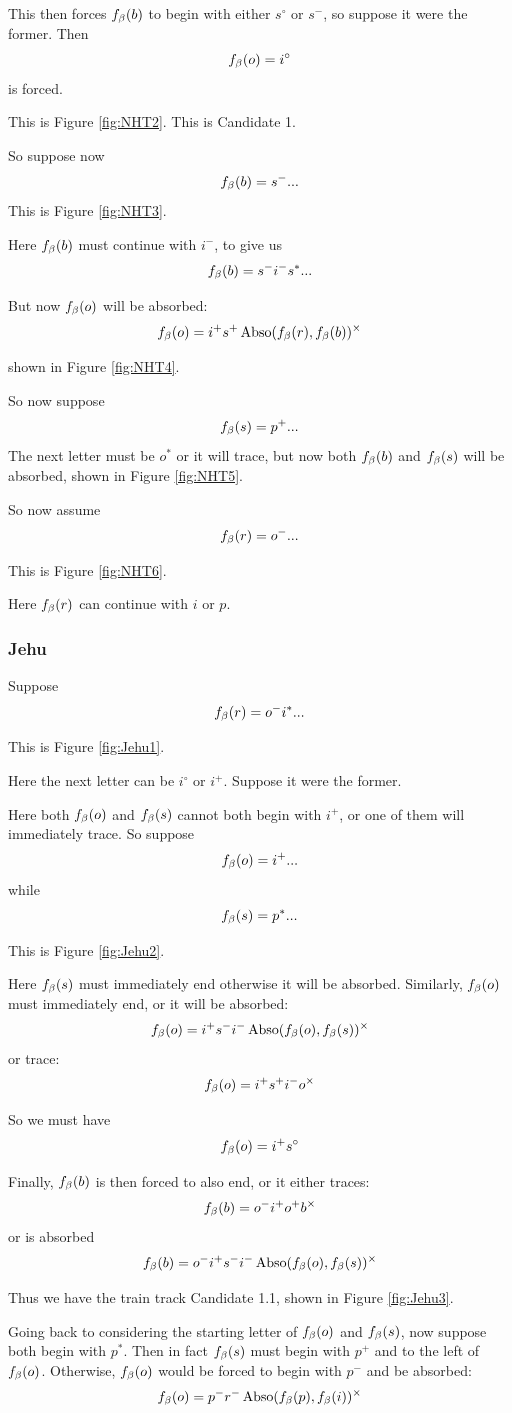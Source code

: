 This then forces $f_\beta(b)$ to begin with either $s^\circ$ or $s^-$, so suppose it were the former. Then 
$$f_\beta(o) = i^\circ$$
is forced.

This is Figure \ref{fig:NHT2}. This is Candidate 1.

So suppose now
$$f_\beta(b) = s^-...$$
This is Figure \ref{fig:NHT3}.

Here $f_\beta(b)$ must continue with $i^-$, to give us
$$f_\beta(b) = s^- i^- s^*...$$

But now $f_\beta(o)$ will be absorbed:
$$f_\beta(o) = i^+ s^+ \operatorname{Abso}(f_\beta(r), f_\beta(b))^\times$$

shown in Figure \ref{fig:NHT4}.

So now suppose 
$$f_\beta(s) = p^+...$$
The next letter must be $o^*$ or it will trace, but now both $f_\beta(b)$ and $f_\beta(s)$ will be absorbed, shown in Figure \ref{fig:NHT5}.

So now assume
$$f_\beta(r) = o^-...$$

This is Figure \ref{fig:NHT6}.

Here $f_\beta(r)$ can continue with $i$ or $p$.


\clearpage

\subsubsection{Jehu}\label{Jehu}
Suppose
$$f_\beta(r) = o^- i^*...$$

This is Figure \ref{fig:Jehu1}.

Here the next letter can be $i^\circ$ or $i^+$. Suppose it were the former.

Here both $f_\beta(o)$ and $f_\beta(s)$ cannot both begin with $i^+$, or one of them will immediately trace. So suppose
\[
f_\beta(o) = i^+...
\]
while
\[
f_\beta(s) = p^*...
\]

This is Figure \ref{fig:Jehu2}.

Here $f_\beta(s)$ must immediately end otherwise it will be absorbed. Similarly, $f_\beta(o)$ must immediately end, or it will be absorbed:
\[
f_\beta(o) = i^+ s^- i^- \operatorname{Abso}(f_\beta(o), f_\beta(s))^\times
\]
or trace:
\[
f_\beta(o) = i^+ s^+ i^- o^\times
\]

So we must have
\[
f_\beta(o) = i^+ s^\circ
\]

Finally, $f_\beta(b)$ is then forced to also end, or it either traces:
\[
f_\beta(b) = o^- i^+ o^+ b^\times
\]
or is absorbed
\[
f_\beta(b) = o^- i^+ s^- i^- \operatorname{Abso}(f_\beta(o), f_\beta(s))^\times
\]

Thus we have the train track Candidate 1.1, shown in Figure \ref{fig:Jehu3}. 

Going back to considering the starting letter of $f_\beta(o)$ and $f_\beta(s)$, now suppose both begin with $p^*$. Then in fact $f_\beta(s)$ must begin with $p^+$ and to the left of $f_\beta(o)$. Otherwise, $f_\beta(o)$ would be forced to begin with $p^-$ and be absorbed:
\[
f_\beta(o) = p^- r^- \operatorname{Abso}(f_\beta(p), f_\beta(i))^\times
\]

